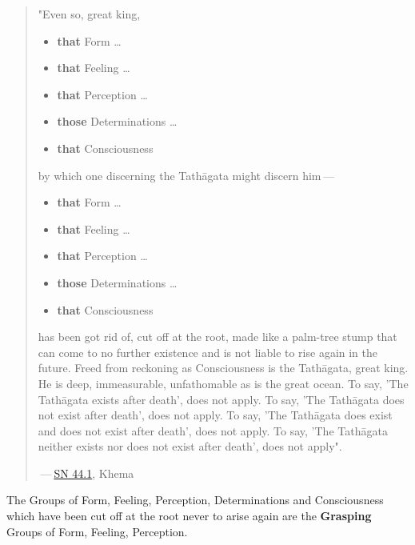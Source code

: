 \begin{quote}
"Even so, great king,

\begin{itemize}
\item
  \textbf{that} Form \ldots\hspace{0pt}
\item
  \textbf{that} Feeling \ldots\hspace{0pt}
\item
  \textbf{that} Perception \ldots\hspace{0pt}
\item
  \textbf{those} Determinations \ldots\hspace{0pt}
\item
  \textbf{that} Consciousness
\end{itemize}

by which one discerning the Tathāgata might discern him --- 

\begin{itemize}
\item
  \textbf{that} Form \ldots\hspace{0pt}
\item
  \textbf{that} Feeling \ldots\hspace{0pt}
\item
  \textbf{that} Perception \ldots\hspace{0pt}
\item
  \textbf{those} Determinations \ldots\hspace{0pt}
\item
  \textbf{that} Consciousness
\end{itemize}

has been got rid of, cut off at the root, made like a palm-tree stump that can come to no further existence and is not liable to rise again in the future. Freed from reckoning as Consciousness is the Tathāgata, great king. He is deep, immeasurable, unfathomable as is the great ocean. To say, 'The Tathāgata exists after death', does not apply. To say, 'The Tathāgata does not exist after death', does not apply. To say, 'The Tathāgata does exist and does not exist after death', does not apply. To say, 'The Tathāgata neither exists nor does not exist after death', does not apply".

 --- \href{https://suttacentral.net/sn44.1/en/bodhi}{SN 44.1}, Khema
\end{quote}

The Groups of Form, Feeling, Perception, Determinations and Consciousness which have been cut off at the root never to arise again are the \textbf{Grasping} Groups of Form, Feeling, Perception.

